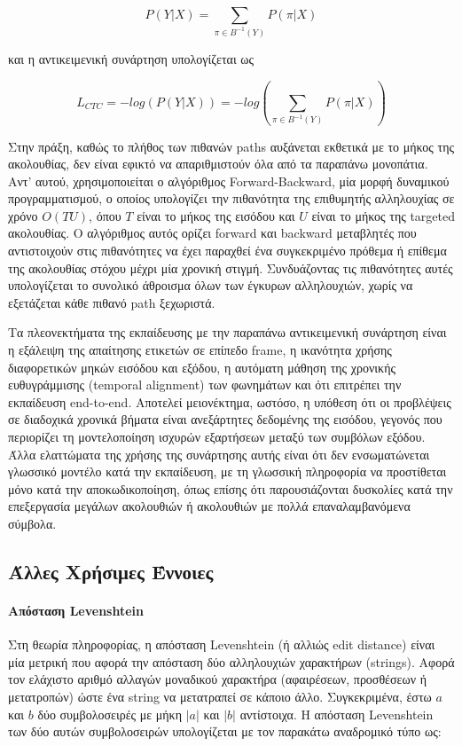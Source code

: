 \[
P(Y|X) = \sum_{\pi \in B^{-1}(Y)} P(\pi|X)
\]

και η αντικειμενική συνάρτηση υπολογίζεται ως 

\[
L_{CTC} = -log (P(Y|X)) = -log (\sum_{\pi \in B^{-1}(Y)} P(\pi|X))
\]

Στην πράξη, καθώς το πλήθος των πιθανών paths αυξάνεται εκθετικά με το μήκος της ακολουθίας, δεν είναι εφικτό να απαριθμιστούν όλα από τα παραπάνω μονοπάτια. Αντ' αυτού, χρησιμοποιείται ο αλγόριθμος Forward-Backward, μία μορφή δυναμικού προγραμματισμού, ο οποίος υπολογίζει την πιθανότητα της επιθυμητής αλληλουχίας σε χρόνο $O(TU)$, όπου $T$ είναι το μήκος της εισόδου και $U$ είναι το μήκος της targeted ακολουθίας. Ο αλγόριθμος αυτός ορίζει forward και backward μεταβλητές που αντιστοιχούν στις πιθανότητες να έχει παραχθεί ένα συγκεκριμένο πρόθεμα ή επίθεμα της ακολουθίας στόχου μέχρι μία χρονική στιγμή. Συνδυάζοντας τις πιθανότητες αυτές υπολογίζεται το συνολικό άθροισμα όλων των έγκυρων αλληλουχιών, χωρίς να εξετάζεται κάθε πιθανό path ξεχωριστά.

Τα πλεονεκτήματα της εκπαίδευσης με την παραπάνω αντικειμενική συνάρτηση είναι η εξάλειψη της απαίτησης ετικετών σε επίπεδο frame, η ικανότητα χρήσης διαφορετικών μηκών εισόδου και εξόδου, η αυτόματη μάθηση της χρονικής ευθυγράμμισης (temporal alignment) των φωνημάτων και ότι επιτρέπει την εκπαίδευση end-to-end. Αποτελεί μειονέκτημα, ωστόσο, η υπόθεση ότι οι προβλέψεις σε διαδοχικά χρονικά βήματα είναι ανεξάρτητες δεδομένης της εισόδου, γεγονός που περιορίζει τη μοντελοποίηση ισχυρών εξαρτήσεων μεταξύ των συμβόλων εξόδου. Άλλα ελαττώματα της χρήσης της συνάρτησης αυτής είναι ότι δεν ενσωματώνεται γλωσσικό μοντέλο κατά την εκπαίδευση, με τη γλωσσική πληροφορία να προστίθεται μόνο κατά την αποκωδικοποίηση, όπως επίσης ότι παρουσιάζονται δυσκολίες κατά την επεξεργασία μεγάλων ακολουθιών ή ακολουθιών με πολλά επαναλαμβανόμενα σύμβολα.

\subsection{Άλλες Χρήσιμες Έννοιες}
\label{OtherBackground}
\paragraph{Απόσταση Levenshtein}

Στη θεωρία πληροφορίας, η απόσταση Levenshtein (ή αλλιώς edit distance) είναι μία μετρική που αφορά την απόσταση δύο αλληλουχιών χαρακτήρων (strings). Αφορά τον ελάχιστο αριθμό αλλαγών μοναδικού χαρακτήρα (αφαιρέσεων, προσθέσεων ή μετατροπών) ώστε ένα string να μετατραπεί σε κάποιο άλλο. Συγκεκριμένα, έστω $a$ και $b$ δύο συμβολοσειρές με μήκη $|a|$ και $|b|$ αντίστοιχα. Η απόσταση Levenshtein των δύο αυτών συμβολοσειρών υπολογίζεται με τον παρακάτω αναδρομικό τύπο ως:

